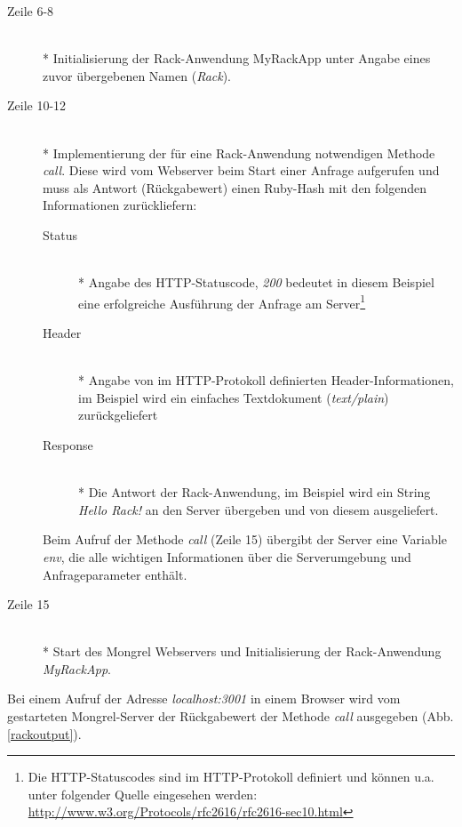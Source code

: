 \begin{description}
\item[Zeile 6-8]\mbox{~}\\*
Initialisierung der Rack-Anwendung MyRackApp unter Angabe eines zuvor übergebenen Namen (\emph{Rack}).
\item[Zeile 10-12]\mbox{~}\\*
Implementierung der für eine Rack-Anwendung notwendigen Methode \emph{call}. Diese wird vom Webserver beim Start einer Anfrage aufgerufen und muss als Antwort (Rückgabewert) einen Ruby-Hash mit den folgenden Informationen zurückliefern:
\begin{description}
\item[Status]\mbox{~}\\*
Angabe des HTTP-Statuscode, \emph{200} bedeutet in diesem Beispiel eine erfolgreiche Ausführung der Anfrage am Server\footnote{Die HTTP-Statuscodes sind im HTTP-Protokoll definiert und können u.a. unter folgender Quelle eingesehen werden: \href{http://www.w3.org/Protocols/rfc2616/rfc2616-sec10.html}{http://www.w3.org/Protocols/rfc2616/rfc2616-sec10.html}}
\item[Header]\mbox{~}\\*
Angabe von im HTTP-Protokoll definierten Header-Informationen,  im Beispiel wird ein einfaches Textdokument (\emph{text/plain}) zurückgeliefert
\item[Response]\mbox{~}\\*
Die Antwort der Rack-Anwendung, im Beispiel wird ein String \emph{Hello Rack!} an den Server übergeben und von diesem ausgeliefert.
\end{description}

Beim Aufruf der Methode \emph{call} (Zeile 15) übergibt der Server eine Variable \emph{env}, die alle wichtigen Informationen über die Serverumgebung und Anfrageparameter enthält.
\item[Zeile 15]\mbox{~}\\*
Start des Mongrel Webservers und Initialisierung der Rack-Anwendung \emph{MyRackApp}.
\end{description}

Bei einem Aufruf der Adresse \emph{localhost:3001} in einem Browser wird vom gestarteten Mongrel-Server der Rückgabewert der Methode \emph{call} ausgegeben (Abb. \ref{rackoutput}). 

